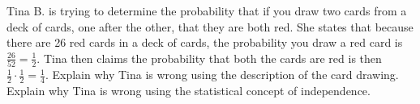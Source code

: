 \documentclass[11pt,letterpaper]{article}
\begin{document}
\newpage



 Tina B. is trying to determine the probability that if you draw two cards from a deck of cards, one after the other, that they are both red. She states that because there are 26 red cards in a deck of cards, the probability you draw a red card is $\frac{26}{52}= \frac{1}{2}$. Tina then claims the probability that both the cards are red is then $\frac{1}{2} \cdot \frac{1}{2}= \frac{1}{4}$. Explain why Tina is wrong using the description of the card drawing. Explain why Tina is wrong using the statistical concept of independence. 
\end{document}
